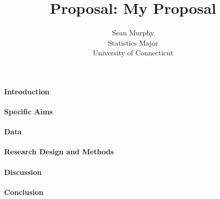 \documentclass[12pt]{article}
\title{Proposal: My Proposal}
\author{Sean Murphy\\
Statistics Major\\
University of Connecticut}
\begin{document}
\maketitle

\paragraph{Introduction}
\lipsum[1]
\citet{larsen2005introduction}

\paragraph{Specific Aims}
\lipsum[2]

\paragraph{Data}
\lipsum[3]

\paragraph{Research Design and Methods}
\lipsum[4]

\paragraph{Discussion}
\lipsum[5]
\citep{weir2002estimating}

\paragraph{Conclusion}
\lipsum[1]



\end{document}
